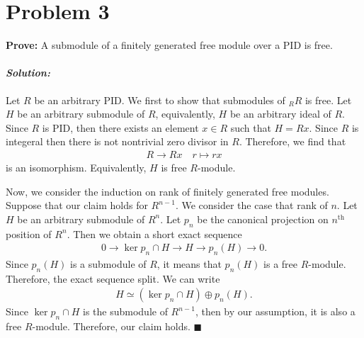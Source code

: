 \documentclass[12pt, a4paper]{article}
\theoremstyle{remark}
\newenvironment{solution}
  {\paragraph{\textit{Solution:}}\par\medskip}
  {\hfill$\blacksquare$\vspace{0.1cm}}
\begin{document}
\section*{Problem 3}
\textbf{Prove:} A submodule of a finitely generated free module over a PID is free.

\begin{solution}
    Let $R$ be an arbitrary PID. We first to show that submodules of $_R R$ is free.
    Let $H$ be an arbitrary submodule of $R$, equivalently, $H$ be an arbitrary ideal of $R$.
    Since $R$ is PID, then there exists an element $x\in R$ such that $H=Rx$. Since $R$ is integeral then there 
    is not nontrivial zero divisor in $R$. Therefore, we find that 
    \begin{align*}
        R \to Rx\quad r\mapsto rx
    \end{align*} 
    is an isomorphism. Equivalently, $H$ is free $R$-module.

    Now, we consider the induction on rank of finitely generated free modules. 
    Suppose that our claim holds for $R^{n-1}$.
    We consider the case that rank of $n$.
    Let $H$ be an arbitrary submodule of $R^n$. Let $p_n$ be the canonical projection on $n^\text{th}$ position of $R^n$.
    Then we obtain a short exact sequence 
    \begin{align*}
        0\to \ker p_n\cap H\to H \to p_n(H) \to 0.
    \end{align*}
    Since $p_n(H)$ is a submodule of $R$, it means that $p_n(H)$ is a free $R$-module. Therefore, the exact sequence split.
    We can write 
    \begin{align*}
        H \simeq (\ker p_n\cap H)\oplus p_n(H).
    \end{align*}
    Since $\ker p_n\cap H$ is the submodule of $R^{n-1}$, then by our assumption, it is also a free $R$-module.
    Therefore, our claim holds.
\end{solution}
\end{document}
